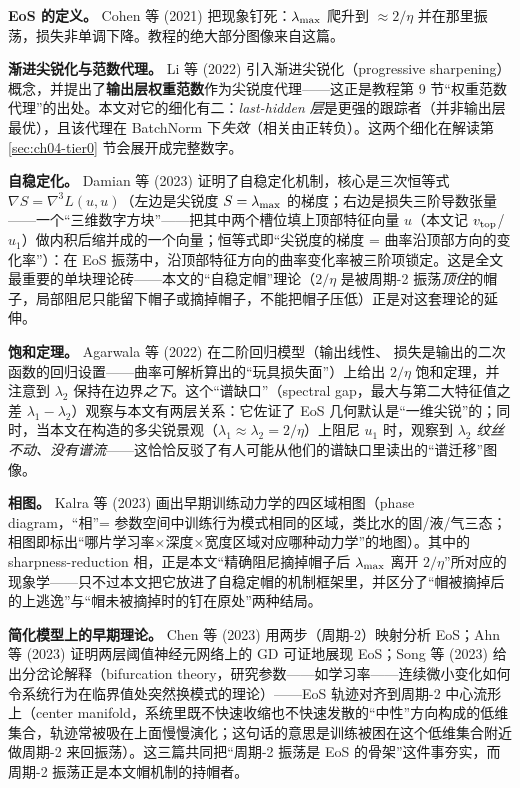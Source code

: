 \textbf{EoS 的定义。} Cohen 等 (2021) 把现象钉死：$\lambda_{\max}$ 爬升到 $\approx 2/\eta$
并在那里振荡，损失非单调下降。教程的绝大部分图像来自这篇。

\textbf{渐进尖锐化与范数代理。} Li 等 (2022) 引入渐进尖锐化（progressive
sharpening）概念，并提出了\textbf{输出层权重范数}作为尖锐度代理——这正是教程第 9
节“权重范数代理”的出处。本文对它的细化有二：\emph{last-hidden
层}是更强的跟踪者（并非输出层最优），且该代理在 BatchNorm
下\emph{失效}（相关由正转负）。这两个细化在解读第 \ref{sec:ch04-tier0}
节会展开成完整数字。

\textbf{自稳定化。} Damian 等 (2023) 证明了自稳定化机制，核心是三次恒等式 $\nabla S
= \nabla^{3}L(u,u)$（左边是尖锐度 $S=\lambda_{\max}$ 的梯度；右边是损失三阶导数张量——一个“三维数字方块”——把其中两个槽位填上顶部特征向量 $u$（本文记 $v_{\mathrm{top}}$/$u_1$）做内积后缩并成的一个向量；恒等式即“尖锐度的梯度 = 曲率沿顶部方向的变化率”）：在 EoS
振荡中，沿顶部特征方向的曲率变化率被三阶项锁定。这是全文最重要的单块理论砖——本文的“自稳定帽”理论（$2/\eta$
是被周期-2
振荡\emph{顶住}的帽子，局部阻尼只能留下帽子或摘掉帽子，不能把帽子压低）正是对这套理论的延伸。

\textbf{饱和定理。} Agarwala 等 (2022) 在二阶回归模型（输出线性、
损失是输出的二次函数的回归设置——曲率可解析算出的“玩具损失面”）上给出 $2/\eta$
饱和定理，并注意到 $\lambda_2$
保持在边界\emph{之下}。这个“谱缺口”（spectral gap，最大与第二大特征值之差
$\lambda_1-\lambda_2$）观察与本文有两层关系：它佐证了 EoS
几何默认是“一维尖锐”的；同时，当本文在构造的多尖锐景观（$\lambda_1\!\approx\!\lambda_2\!=\!2/\eta$）上阻尼
$u_1$ 时，观察到 $\lambda_2$
\emph{纹丝不动、没有谱流}——这恰恰反驳了有人可能从他们的谱缺口里读出的“谱迁移”图像。

\textbf{相图。} Kalra 等 (2023) 画出早期训练动力学的四区域相图（phase diagram，“相”= 参数空间中训练行为模式相同的区域，类比水的固/液/气三态；相图即标出“哪片学习率×深度×宽度区域对应哪种动力学”的地图）。其中的 sharpness-reduction 相，正是本文“精确阻尼摘掉帽子后 $\lambda_{\max}$ 离开
$2/\eta$”所对应的现象学——只不过本文把它放进了自稳定帽的机制框架里，并区分了“帽被摘掉后的上逃逸”与“帽未被摘掉时的钉在原处”两种结局。

\textbf{简化模型上的早期理论。} Chen 等 (2023) 用两步（周期-2）映射分析 EoS；Ahn 等
(2023) 证明两层阈值神经元网络上的 GD 可证地展现 EoS；Song 等 (2023)
给出分岔论解释（bifurcation theory，研究参数——如学习率——连续微小变化如何令系统行为在临界值处突然换模式的理论）——EoS 轨迹对齐到周期-2 中心流形上（center manifold，系统里既不快速收缩也不快速发散的“中性”方向构成的低维集合，轨迹常被吸在上面慢慢演化；这句话的意思是训练被困在这个低维集合附近做周期-2 来回振荡）。这三篇共同把“周期-2 振荡是 EoS
的骨架”这件事夯实，而周期-2 振荡正是本文帽机制的持帽者。

